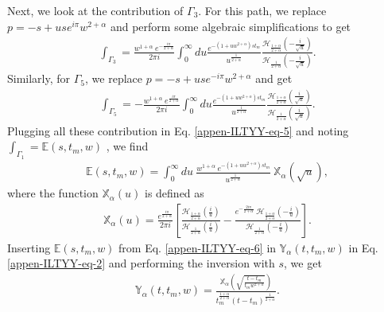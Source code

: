 \documentclass[superscriptaddress,amsmath,amssymb,aps,onecolumn]{revtex4}
\begin{document}
Next, we look at the contribution of $\Gamma _3$. For this path, we replace $p=-s+u s e^{i \pi} w^{2+\alpha} $ and perform some algebraic simplifications to get
\begin{align}
\int _{\Gamma _3} = \frac{w^{1+\alpha}~e^{-\frac{i \pi }{2+\alpha}}}{2 \pi i} \int _{0}^{\infty} du \frac{e^{-(1+u w^{2+\alpha}) s t_m}}{u^{\frac{1}{2+\alpha}}} \frac{\mathcal{H}_{\frac{1+\alpha}{2+\alpha}} \left( -\frac{i}{\sqrt{u}}\right)}{\mathcal{H}_{\frac{1}{2+\alpha}} \left( -\frac{i}{\sqrt{u}}\right)}. \nonumber
\end{align}  
Similarly, for $\Gamma _5$, we replace $p=-s+u s e^{-i \pi} w^{2+\alpha} $ and get 
 \begin{align}
\int _{\Gamma _5} = -\frac{w^{1+\alpha}~e^{\frac{i \pi }{2+\alpha}}}{2 \pi i} \int _{0}^{\infty} du \frac{e^{-(1+u w^{2+\alpha}) s t_m}}{u^{\frac{1}{2+\alpha}}} \frac{\mathcal{H}_{\frac{1+\alpha}{2+\alpha}} \left( \frac{i}{\sqrt{u}}\right)}{\mathcal{H}_{\frac{1}{2+\alpha}} \left( \frac{i}{\sqrt{u}}\right)}. \nonumber
\end{align}  
Plugging all these contribution in Eq. \eqref{appen-ILTYY-eq-5} and noting $\int _{\Gamma _1} = \mathbb{E}(s,t_m,w)$ , we find
\begin{align}
\mathbb{E}(s,t_m,w) = \int _{0}^{\infty} du~ \frac{w^{1+\alpha}~e^{-(1+u w^{2+\alpha}) s t_m}}{u^{\frac{1}{2+\alpha}}}~\mathbb{X}_{\alpha} \left( \sqrt{u}\right), 
\label{appen-ILTYY-eq-6}
\end{align}
where the function $\mathbb{X}_{\alpha} \left( u\right)$ is defined as
\begin{align}
\mathbb{X}_{\alpha} \left( u\right) =\frac{e^{\frac{i \pi }{2+\alpha}}}{2 \pi i} \left[\frac{\mathcal{H}_{\frac{1+\alpha}{2+\alpha}} \left( \frac{i}{{u}}\right)}{\mathcal{H}_{\frac{1}{2+\alpha}} \left( \frac{i}{{u}}\right)} -\frac{e^{-\frac{2i \pi }{2+\alpha}}~\mathcal{H}_{\frac{1+\alpha}{2+\alpha}} \left( -\frac{i}{{u}}\right)}{\mathcal{H}_{\frac{1}{2+\alpha}} \left(- \frac{i}{{u}}\right)} \right].
\label{new-appen-ILTYY-eq-7}
\end{align}
Inserting $\mathbb{E}(s,t_m,w)$ from Eq. \eqref{appen-ILTYY-eq-6} in $\mathbb{Y}_{\alpha} \left(t,t_m,w \right)$ in Eq. \eqref{appen-ILTYY-eq-2} and performing the inversion with $s$, we get
\begin{align}
\mathbb{Y}_{\alpha} \left(t,t_m,w \right) = \frac{\mathbb{X}_{\alpha} \left( \sqrt{\frac{t-t_m}{t_m w^{2+\alpha}}}  \right)}{t_m^{\frac{1+\alpha}{2+\alpha}} (t-t_m)^{\frac{1}{2+\alpha}}}.
\label{appen-ILTYY-eq-71}
\end{align}
\end{document}
